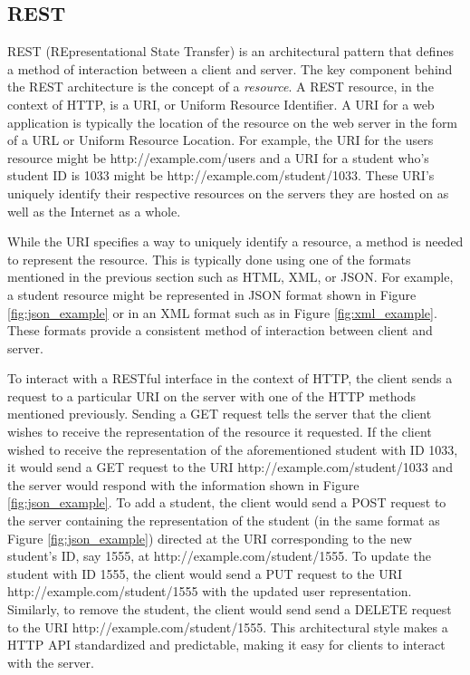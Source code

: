 \subsection{REST}

REST (REpresentational State Transfer) is an architectural pattern that defines a method of interaction between a client and server. The key component behind the REST architecture is the concept of a {\em{resource}}. A REST resource, in the context of HTTP, is a URI, or Uniform Resource Identifier. A URI for a web application is typically the location of the resource on the web server in the form of a URL or Uniform Resource Location\cite{fielding2000representational}. For example, the URI for the users resource might be http://example.com/users and a URI for a student who's student ID is 1033 might be http://example.com/student/1033. These URI's uniquely identify their respective resources on the servers they are hosted on as well as the Internet as a whole.

While the URI specifies a way to uniquely identify a resource, a method is needed to represent the resource\cite{fielding2000representational}. This is typically done using one of the formats mentioned in the previous section such as HTML, XML, or JSON. For example, a student resource might be represented in JSON format shown in Figure \ref{fig:json_example} or in an XML format such as in Figure \ref{fig:xml_example}. These formats provide a consistent method of interaction between client and server.

To interact with a RESTful interface in the context of HTTP, the client sends a request to a particular URI on the server with one of the HTTP methods mentioned previously. Sending a GET request tells the server that the client wishes to receive the representation of the resource it requested. If the client wished to receive the representation of the aforementioned student with ID 1033, it would send a GET request to the URI http://example.com/student/1033 and the server would respond with the information shown in Figure \ref{fig:json_example}. To add a student, the client would send a POST request to the server containing the representation of the student (in the same format as Figure \ref{fig:json_example}) directed at the URI corresponding to the new student's ID, say 1555, at http://example.com/student/1555. To update the student with ID 1555, the client would send a PUT request to the URI http://example.com/student/1555 with the updated user representation. Similarly, to remove the student, the client would send send a DELETE request to the URI http://example.com/student/1555. This architectural style makes a HTTP API standardized and predictable, making it easy for clients to interact with the server.

